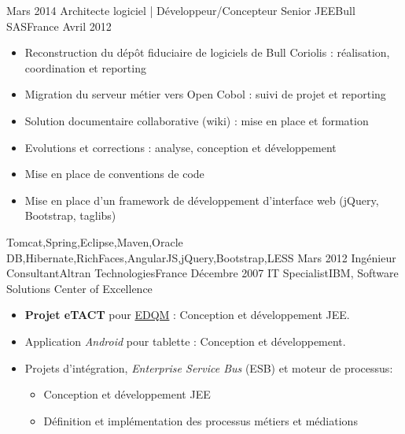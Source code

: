 \documentclass[localFont,alternative,10pt,compact]{yaac-another-awesome-cv}
\begin{document}
\begin{experiences}
	  \emptySeparator
	  \experience
	    {Mars 2014}     {Architecte logiciel | Développeur/Concepteur Senior JEE}{Bull SAS}{France}
	    {Avril 2012}    {
	                      \begin{itemize}
	                        \item Reconstruction du dépôt fiduciaire de logiciels de Bull Coriolis : réalisation, coordination et reporting
	                        \item Migration du serveur métier vers Open Cobol : suivi de projet et reporting                
	                        \item Solution documentaire collaborative (wiki) : mise en place et formation                   
	                        \item Evolutions et corrections : analyse, conception et développement                          
	                        \item Mise en place de conventions de code                                                      
	                        \item Mise en place d'un framework de développement d'interface web (jQuery, Bootstrap, taglibs)
	                      \end{itemize}
	                    }
	                    {Tomcat,Spring,Eclipse,Maven,Oracle DB,Hibernate,RichFaces,AngularJS,jQuery,Bootstrap,LESS}
	  \emptySeparator
	  \consultantexperience
	  {Mars 2012}       {Ingénieur Consultant}{Altran Technologies}{France}
	  {Décembre 2007}   {IT Specialist}{IBM, Software Solutions Center of Excellence}
	                    {
	                      \begin{itemize}
	                        \item \textbf{Projet eTACT} pour \href{https://www.edqm.eu/fr/contexte-mission-cd-p-phcmed.html}{EDQM} : Conception et développement JEE.
	                        \item Application \emph{Android} pour tablette : Conception et développement.
	                        \item Projets d'intégration, \emph{Enterprise Service Bus} (ESB) et moteur de processus:
	                        \begin{itemize}
	                          \item Conception et développement JEE
	                          \item Définition et implémentation des processus métiers et médiations
	                        \end{itemize}

\end{itemize}}
\end{experiences}
\end{document}
